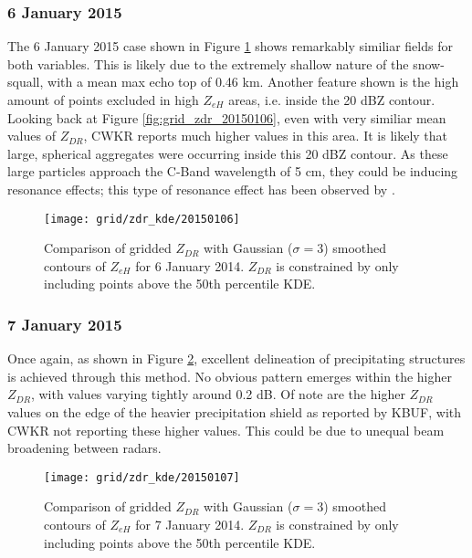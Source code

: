 \subsubsection{6 January 2015}
The 6 January 2015 case shown in Figure \ref{fig:grid_zdr_kde_20150106} shows remarkably similiar fields for both variables. This is likely due to the extremely shallow nature of the snow-squall, with a mean max echo top of 0.46 km. Another feature shown is the high amount of points excluded in high $Z_{eH}$ areas,  i.e. inside the 20 dBZ contour. Looking back at Figure \ref{fig:grid_zdr_20150106}, even with very similiar mean values of $Z_{DR}$, CWKR reports much higher values in this area. It is likely that large, spherical aggregates were occurring inside this 20 dBZ contour. As these large particles approach the C-Band wavelength of 5 cm, they could be inducing resonance effects; this type of resonance effect has been observed by \citet{Hassan2017}.
\begin{figure}[H]
\texttt{[image: grid/zdr\_kde/20150106]}
\caption{Comparison of gridded $Z_{DR}$ with Gaussian ($\sigma=3$) smoothed contours of $Z_{eH}$ for 6 January 2014. $Z_{DR}$ is constrained by only including points above the 50th percentile KDE.} 
\label{fig:grid_zdr_kde_20150106}
\end{figure}
\subsubsection{7 January 2015}
Once again, as shown in Figure \ref{fig:grid_zdr_kde_20150107}, excellent delineation of precipitating structures is achieved through this method. No obvious pattern emerges within the higher $Z_{DR}$, with values varying tightly around 0.2 dB. Of note are the higher $Z_{DR}$ values on the edge of the heavier precipitation shield as reported by KBUF, with CWKR not reporting these higher values. This could be due to unequal beam broadening between radars.
\begin{figure}[H]
\texttt{[image: grid/zdr\_kde/20150107]}
\caption{Comparison of gridded $Z_{DR}$ with Gaussian ($\sigma=3$) smoothed contours of $Z_{eH}$ for 7 January 2014. $Z_{DR}$ is constrained by only including points above the 50th percentile KDE.} 
\label{fig:grid_zdr_kde_20150107}
\end{figure}

